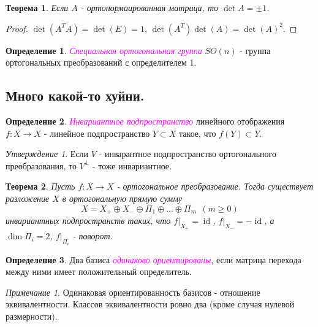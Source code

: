 \documentclass[a4paper,100pt]{article}
\theoremstyle{indented}
\newtheorem{theorem}{Теорема}
\theoremstyle{definition}
\newtheorem{defn}{Определение}
\theoremstyle{remark}
\newtheorem{remark}{Примечание}
\newtheorem{stat}{Утверждение}
\DeclareMathOperator{\ra}{\rightarrow}
\DeclareMathOperator{\id}{id}
\begin{document}
\begin{theorem}
    Если $A$ - ортонормаированная матрица, то $\det A = \pm 1$. 
\end{theorem}

\begin{proof}
    $\det (A^T A) = \det (E) = 1$, $\det (A^T) \det(A) = \det(A)^2$. 
\end{proof}

\begin{defn}
    \textit{\textcolor{magenta}{\hypertarget{s76}{Специальная ортогональная группа}}} $SO(n)$ - группа ортогональных преобразований с определителем 1.
\end{defn}

\subsection{Много какой-то хуйни.}

\begin{defn}
    \textit{\textcolor{magenta}{\hypertarget{s77}{Инвариантное подпространство}}} линейного отображения $f: X\ra X$ - линейное подпространство $Y\subset X$ такое, что $f(Y)\subset Y$. 
\end{defn}

\begin{stat}
    Если $V$ - инварантное подпространство ортогонального преобразования, то $V^{\perp}$ - тоже инвариантное.
\end{stat}

\begin{theorem}
    Пусть $f:X\ra X$ - ортогональное преобразование. Тогда существует разложение $X$ в ортогональную прямую сумму
    \[
        X=X_+ \oplus X_- \oplus \Pi_1 \oplus \ldots \oplus \Pi_m \: \: (m\geq 0)
    \]
    инвариантных подпространств таких, что $f|_{X_+}=\id$, $f|_{X_-}=-\id$, а $\dim \Pi_i=2$, $f|_{\Pi_i}$ - поворот.
\end{theorem}

\begin{defn}
    Два базиса \textit{\textcolor{magenta}{\hypertarget{s78}{одинаково ориентированы}}}, если матрица перехода между ними имеет положительный определитель.
\end{defn}

\begin{remark}
    Одинаковая ориентированность базисов - отношение эквивалентности. Классов эквивалентности ровно два (кроме случая нулевой размерности).
\end{remark}
\end{document}
